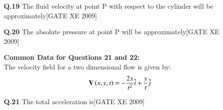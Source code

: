 \documentclass[journal,12pt,onecolumn]{IEEEtran}
\theoremstyle{remark}
\begin{document}
\begin{enumerate}
\begin{enumerate}
\item[\textbf{Q.19}] The fluid velocity at point P with respect to the cylinder will be approximately\hfill[GATE XE 2009]

\begin{enumerate}[leftmargin=*, itemsep=4pt]
\end{enumerate}

\vspace{0.3cm}

\item[\textbf{Q.20}] The absolute pressure at point P will be approximately\hfill[GATE XE 2009]

\begin{enumerate}[leftmargin=*, itemsep=4pt]
\end{enumerate}

\vspace{0.5cm}

\textbf{Common Data for Questions 21 and 22:}\\
The velocity field for a two dimensional flow is given by:
$$
\mathbf{V}\left(x, y, t\right) = -\frac{2x}{t^2}\hat{i} + \frac{y}{t}\hat{j}
$$

\item[\textbf{Q.21}] The total acceleration is\hfill[GATE XE 2009]

\begin{enumerate}[leftmargin=*, itemsep=4pt]
\end{enumerate}


\end{enumerate}
\end{enumerate}
\end{document}
